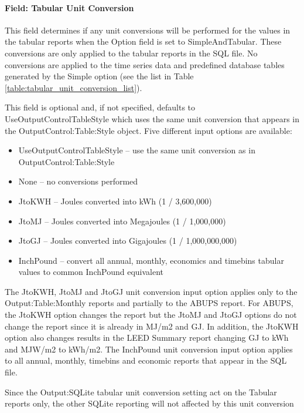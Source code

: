 \paragraph{Field: Tabular Unit Conversion}\label{field-tabular-unit-conversion}

This field determines if any unit conversions will be performed for the values in the tabular reports when the Option field is set to SimpleAndTabular. These conversions are only applied to the tabular reports in the SQL file. No conversions are applied to the time series data and predefined database tables generated by the Simple option (see the list in Table \ref{table:tabular_unit_conversion_list}).

This field is optional and, if not specified, defaults to UseOutputControlTableStyle which uses the same unit conversion that appears in the OutputControl:Table:Style object. Five different input options are available:

\begin{itemize}
\item 
UseOutputControlTableStyle -- use the same unit conversion as in OutputControl:Table:Style
\item 
None -- no conversions performed
\item 
JtoKWH -- Joules converted into kWh (1 / 3,600,000)
\item 
JtoMJ -- Joules converted into Megajoules (1 / 1,000,000)
\item
JtoGJ -- Joules converted into Gigajoules (1 / 1,000,000,000)
\item 
InchPound -- convert all annual, monthly, economics and timebins tabular values to common InchPound equivalent
\end{itemize}

The JtoKWH, JtoMJ and JtoGJ unit conversion input option applies only to the Output:Table:Monthly reports and partially to the ABUPS report. For ABUPS, the JtoKWH option changes the report but the JtoMJ and JtoGJ options do not change the report since it is already in MJ/m2 and GJ. In addition, the JtoKWH option also changes results in the LEED Summary report changing GJ to kWh and MJW/m2 to kWh/m2. The InchPound unit conversion input option applies to all annual, monthly, timebins and economic reports that appear in the SQL file. 

Since the Output:SQLite tabular unit conversion setting act on the Tabular reports only, the other SQLite reporting will not affected by this unit conversion setting. The table below lists the affected SQLite tabular tables. 
 
